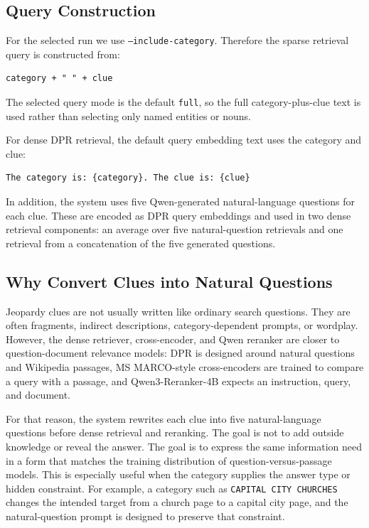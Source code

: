 \documentclass[11pt]{article}
\begin{document}
\subsection{Query Construction}

For the selected run we use \texttt{--include-category}. Therefore the sparse retrieval query is constructed from:

\begin{verbatim}
category + " " + clue
\end{verbatim}

The selected query mode is the default \texttt{full}, so the full category-plus-clue text is used rather than selecting only named entities or nouns.

For dense DPR retrieval, the default query embedding text uses the category and clue:

\begin{verbatim}
The category is: {category}. The clue is: {clue}
\end{verbatim}

In addition, the system uses five Qwen-generated natural-language questions for each clue. These are encoded as DPR query embeddings and used in two dense retrieval components: an average over five natural-question retrievals and one retrieval from a concatenation of the five generated questions.

\subsection{Why Convert Clues into Natural Questions}

Jeopardy clues are not usually written like ordinary search questions. They are often fragments, indirect descriptions, category-dependent prompts, or wordplay. However, the dense retriever, cross-encoder, and Qwen reranker are closer to question-document relevance models: DPR is designed around natural questions and Wikipedia passages, MS MARCO-style cross-encoders are trained to compare a query with a passage, and Qwen3-Reranker-4B expects an instruction, query, and document.

For that reason, the system rewrites each clue into five natural-language questions before dense retrieval and reranking. The goal is not to add outside knowledge or reveal the answer. The goal is to express the same information need in a form that matches the training distribution of question-versus-passage models. This is especially useful when the category supplies the answer type or hidden constraint. For example, a category such as \texttt{CAPITAL CITY CHURCHES} changes the intended target from a church page to a capital city page, and the natural-question prompt is designed to preserve that constraint.
\end{document}
